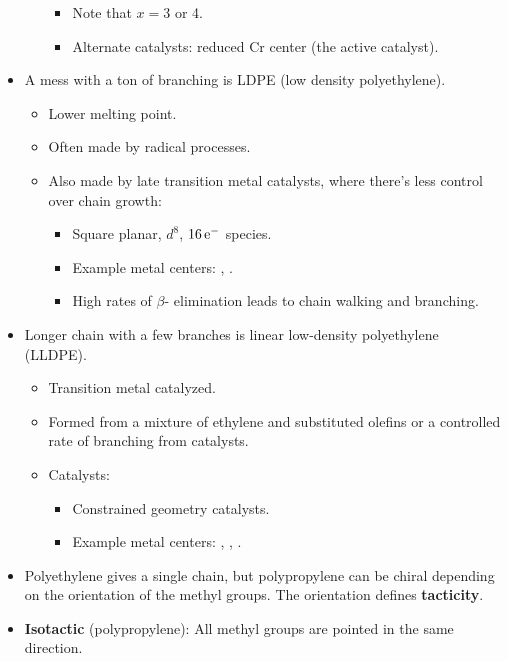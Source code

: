 \documentclass[../notes.tex]{subfiles}
\begin{document}
\begin{itemize}
\begin{itemize}
\begin{itemize}
            \item Note that $x=3$ or 4.
            \item Alternate catalysts:  reduced Cr center (the active catalyst).
        \end{itemize}
    \end{itemize}
    \item A mess with a ton of branching is LDPE (low density polyethylene).
    \begin{itemize}
        \item Lower melting point.
        \item Often made by radical processes.
        \item Also made by late transition metal catalysts, where there's less control over chain growth:
        \begin{itemize}
            \item Square planar, $d^8$, $16\,\e[-]$ species.
            \item Example metal centers: , .
            \item High rates of $\beta$- elimination leads to chain walking and branching.
        \end{itemize}
    \end{itemize}
    \item Longer chain with a few branches is linear low-density polyethylene (LLDPE).
    \begin{itemize}
        \item Transition metal catalyzed.
        \item Formed from a mixture of ethylene and substituted olefins or a controlled rate of branching from catalysts.
        \item Catalysts:
        \begin{itemize}
            \item Constrained geometry catalysts.
            \item Example metal centers: , , .
        \end{itemize}
    \end{itemize}
    \item Polyethylene gives a single chain, but polypropylene can be chiral depending on the orientation of the methyl groups. The orientation defines \textbf{tacticity}.
    \item \textbf{Isotactic} (polypropylene): All methyl groups are pointed in the same direction.

\end{itemize}
\end{document}
